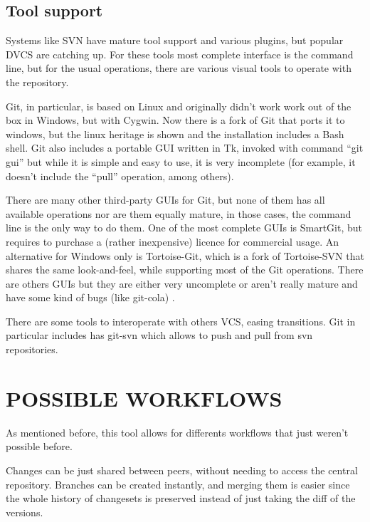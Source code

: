 \subsection{Tool support}

Systems like SVN have mature tool support and various plugins, but popular DVCS are catching up.
For these tools most complete interface is the command line, but for the usual operations, 
there are various visual tools to operate with the repository.

Git, in particular, is based on Linux and originally didn't work work out of the box in Windows, 
but with Cygwin. 
Now there is a fork of Git that ports it to windows, but the linux heritage is 
shown and the installation includes a Bash shell. 
Git also includes a portable GUI written in Tk, invoked with command ``git gui'' 
but while it is simple and easy to use, it is very incomplete (for example, 
it doesn't include the ``pull'' operation, among others).

There are many other third-party GUIs for Git, but none of them has all available operations nor are them equally mature, 
in those cases, the command line is the only way to do them. One of the most complete GUIs is SmartGit, but 
requires to purchase a (rather inexpensive) licence for commercial usage. An alternative for Windows only 
is Tortoise-Git, which is a fork of Tortoise-SVN that shares the same look-and-feel, while supporting most of the 
Git operations. There are others GUIs but they are either very uncomplete or aren't really mature and have 
some kind of bugs (like git-cola) \cite{interfaces}.

There are some tools to interoperate with others VCS, easing transitions.
Git in particular includes has git-svn which allows to push and pull from svn repositories. 




\section{POSSIBLE WORKFLOWS}

As mentioned before, this tool allows for differents workflows that just weren't 
possible before.

Changes can be just shared between peers, without needing to access the central 
repository. Branches can be created instantly, and merging them is easier since 
the whole history of changesets is preserved instead of just taking the diff of 
the versions.


